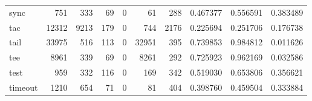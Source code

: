 \begin{tabular}{lrrrrrrrrr}
sync      &                                                751 &                                                333 &                                                 69 &                                                  0 &                                                 61 &                                                288 &                                           0.467377 &                               0.556591 &                             0.383489 \\
tac       &                                              12312 &                                               9213 &                                                179 &                                                  0 &                                                744 &                                               2176 &                                           0.225694 &                               0.251706 &                             0.176738 \\
tail      &                                              33975 &                                                516 &                                                113 &                                                  0 &                                              32951 &                                                395 &                                           0.739853 &                               0.984812 &                             0.011626 \\
tee       &                                               8961 &                                                339 &                                                 69 &                                                  0 &                                               8261 &                                                292 &                                           0.725923 &                               0.962169 &                             0.032586 \\
test      &                                                959 &                                                332 &                                                116 &                                                  0 &                                                169 &                                                342 &                                           0.519030 &                               0.653806 &                             0.356621 \\
timeout   &                                               1210 &                                                654 &                                                 71 &                                                  0 &                                                 81 &                                                404 &                                           0.398760 &                               0.459504 &                             0.333884 \\

\end{tabular}
